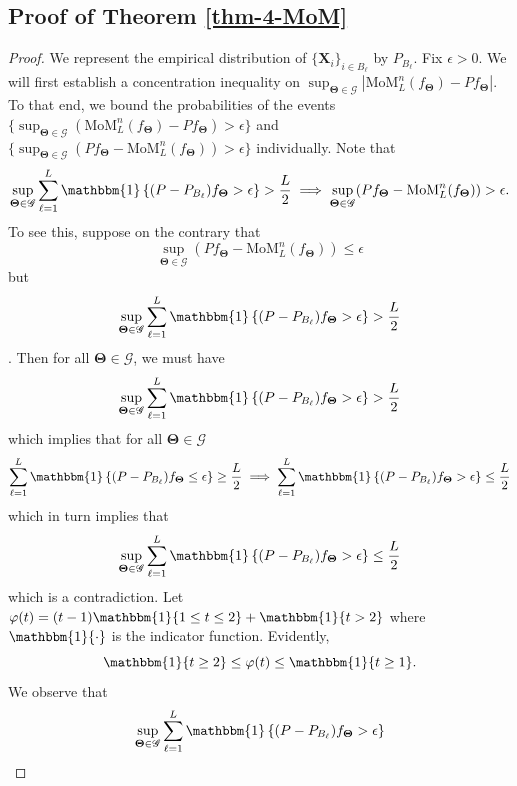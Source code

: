 \documentclass[12pt]{article}
\newcommand{\bX}{\boldsymbol{X}}
\newcommand{\bTheta}{\boldsymbol{\Theta}}
\newcommand{\cL}{\mathcal{L}}
\newcommand{\cO}{\mathcal{O}}
\newcommand{\one}{\mathbbm{1}}
\begin{document}
\subsection{Proof of Theorem \ref{thm-4-MoM}}

\begin{proof} 
We represent the empirical distribution of $\{\bX_i\}_{i \in B_\ell}$ by $P_{B_{\ell}}$. Fix $\epsilon>0$. We will first establish a concentration inequality on $\sup_{\bTheta \in \mathscr{G}} |\text{MoM}_L^n (f_{\bTheta}) - P f_{\bTheta} |$. To that end, we bound the probabilities of the events $\{\sup_{\bTheta \in \mathscr{G}}(\text{MoM}_L^n (f_{\bTheta}) - P f_{\bTheta}) >\epsilon\}$ and $\{\sup_{\bTheta \in \mathscr{G}}  ( P f_{\bTheta} - \text{MoM}_L^n (f_{\bTheta})) > \epsilon\}$ individually. Note that 
\begin{equation}
\sup_{\bTheta \in \mathscr{G}}\sum_{\ell = 1}^L \one\left\{(P-P_{B_\ell})f_{\bTheta} > \epsilon\right\} > \frac{L}{2} \implies \sup_{\bTheta \in \mathscr{G}} (P f_{\bTheta} - \text{MoM}_L^n (f_{\bTheta})) > \epsilon.
\end{equation}
To see this, suppose on the contrary that \[\sup_{\bTheta \in \mathscr{G}}  (P f_{\bTheta} - \text{MoM}_L^n (f_{\bTheta})) \le \epsilon\] but \[\sup_{\bTheta \in \mathscr{G}}\sum_{\ell = 1}^L \one\left\{(P-P_{B_\ell})f_{\bTheta} > \epsilon\right\} > \frac{L}{2}\]. 
Then for all $\bm{\Theta}\in \mathscr{G}$, we must have \[\sup_{\bTheta \in \mathscr{G}}\sum_{\ell = 1}^L \one\left\{(P-P_{B_\ell})f_{\bTheta} > \epsilon\right\} > \frac{L}{2}\] which implies that for all $\bm{\Theta}\in \mathscr{G}$ \[\sum_{\ell = 1}^L \one\left\{(P-P_{B_\ell})f_{\bTheta} \le \epsilon\right\} \ge \frac{L}{2} \implies \sum_{\ell = 1}^L \one\left\{(P-P_{B_\ell})f_{\bTheta} > \epsilon\right\} \le \frac{L}{2}\] which in turn implies that \[\sup_{\bTheta \in \mathscr{G}}\sum_{\ell = 1}^L \one\left\{(P-P_{B_\ell})f_{\bTheta} > \epsilon\right\} \le \frac{L}{2}\] which is a contradiction. Let $\varphi(t) = (t-1) \one\{1 \le t \le 2\} + \one\{t >2\}$ where $\one\{\cdot\}$ is the indicator function. Evidently,
\begin{equation}
    \label{eq6}
    \one\{t \ge 2\} \le \varphi(t) \le \one\{t \ge 1\}.
\end{equation} 
We observe that
\begingroup
\allowdisplaybreaks
\begin{align}
    \sup_{\bTheta \in \mathscr{G}}\sum_{\ell = 1}^L \one\left\{(P-P_{B_\ell})f_{\bTheta} > \epsilon\right\}

\end{align}
\end{proof}
\end{document}
